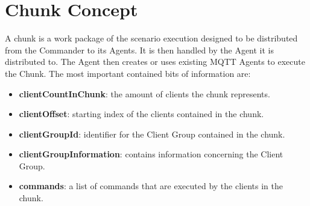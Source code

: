 \section{Chunk Concept}
A chunk is a work package of the scenario execution designed to be distributed from the Commander to its Agents.
It is then handled by the Agent it is distributed to.
The Agent then creates or uses existing MQTT Agents to execute the Chunk.
The most important contained bits of information are:
\begin{itemize}
	\item \textbf{clientCountInChunk}: the amount of clients the chunk represents.
	\item \textbf{clientOffset}: starting index of the clients contained in the chunk.
	\item \textbf{clientGroupId}: identifier for the Client Group contained in the chunk.
	\item \textbf{clientGroupInformation}: contains information concerning the Client Group.
	\item \textbf{commands}: a list of commands that are executed by the clients in the chunk.
\end{itemize}

